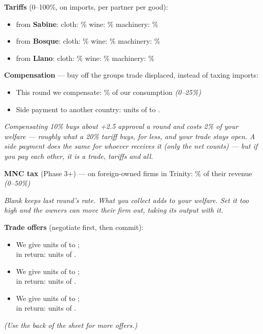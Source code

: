 \documentclass[11pt]{article}
\newcommand{\blank}[1]{\underline{\hspace{#1}}}
\begin{document}
\vspace{4pt}
{\bfseries Tariffs} (0--100\%, on imports, per partner per good):\par
\begin{itemize}[nosep,leftmargin=1.4em]
  \item from \textbf{Sabine}: \quad cloth: \blank{1.4cm}\% \quad wine: \blank{1.4cm}\% \quad machinery: \blank{1.4cm}\%
  \item from \textbf{Bosque}: \quad cloth: \blank{1.4cm}\% \quad wine: \blank{1.4cm}\% \quad machinery: \blank{1.4cm}\%
  \item from \textbf{Llano}: \quad cloth: \blank{1.4cm}\% \quad wine: \blank{1.4cm}\% \quad machinery: \blank{1.4cm}\%
\end{itemize}

\vspace{4pt}
{\bfseries Compensation} --- buy off the groups trade displaced, instead of taxing imports:\par
\begin{itemize}[nosep,leftmargin=1.4em]
  \item This round we compensate: \blank{1.4cm}\% of our consumption \quad \textit{(0--25\%)}
  \item Side payment to another country: \blank{1.6cm} units of \blank{2cm} to \blank{2.2cm}.
\end{itemize}
\textit{Compensating 10\% buys about +2.5 approval a round and costs 2\% of your welfare --- roughly what a 20\% tariff buys, for less, and your trade stays open. A side payment does the same for whoever receives it (only the net counts) --- but if you pay each other, it is a trade, tariffs and all.}

\vspace{4pt}
{\bfseries MNC tax} (Phase 3+) --- on foreign-owned firms in Trinity: \blank{1.4cm}\% of their revenue \quad \textit{(0--50\%)}\par
\textit{Blank keeps last round's rate. What you collect adds to your welfare. Set it too high and the owners can move their firm out, taking its output with it.}

\vspace{4pt}
{\bfseries Trade offers} (negotiate first, then commit):\par
\begin{itemize}[itemsep=4pt,leftmargin=1.4em]
  \item We give \blank{1.8cm} units of \blank{2.2cm} to \blank{2.2cm};\\[2pt] in return: \blank{1.8cm} units of \blank{2.2cm}.
  \item We give \blank{1.8cm} units of \blank{2.2cm} to \blank{2.2cm};\\[2pt] in return: \blank{1.8cm} units of \blank{2.2cm}.
  \item We give \blank{1.8cm} units of \blank{2.2cm} to \blank{2.2cm};\\[2pt] in return: \blank{1.8cm} units of \blank{2.2cm}.
\end{itemize}
\textit{(Use the back of the sheet for more offers.)}
\end{document}

